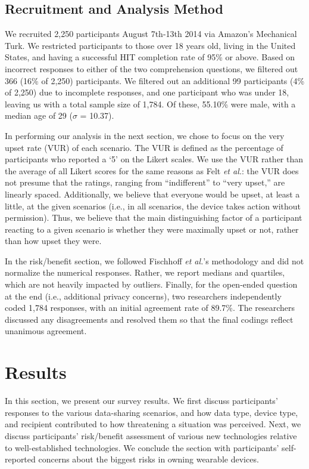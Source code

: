 \documentclass{acm_proc_article-sp}
\begin{document}
\subsection{Recruitment and Analysis Method}
We recruited 2,250 participants August 7th-13th 2014 via Amazon's Mechanical Turk. We restricted participants to those over 18 years old, living in the United States, and having a successful HIT completion rate of 95\% or above. Based on incorrect responses to either of the two comprehension questions, we filtered out 366 (16\% of 2,250) participants. We filtered out an additional 99 participants (4\% of 2,250) due to incomplete responses, and one participant who was under 18, leaving us with a total sample size of 1,784. Of these, 55.10\% were male, with a median age of 29 ($\sigma$ = 10.37).

In performing our analysis in the next section, we chose to focus on the very upset rate (VUR) of each scenario.  The VUR is defined as the percentage of participants who reported a `5' on the Likert scales.
We use the VUR rather than the average of all Likert scores for the same reasons as Felt {\it et al.}: the VUR does not presume that the ratings, ranging from ``indifferent'' to ``very upset,'' are linearly spaced. Additionally, we believe that everyone would be upset, at least a little, at the given scenarios (i.e., in all scenarios, the device takes action without permission). Thus, we believe that the main distinguishing factor of a participant reacting to a given scenario is whether they were maximally upset or not, rather than how upset they were.

In the risk/benefit section, we followed Fischhoff {\it et al.}'s methodology and did not normalize the numerical responses. Rather, we report medians and quartiles, which are not heavily impacted by outliers. Finally, for the open-ended question at the end (i.e., additional privacy concerns), two researchers independently coded 1,784 responses, with an initial agreement rate of 89.7\%. The researchers discussed any disagreements and resolved them so that the final codings reflect unanimous agreement.


\section{Results}
In this section, we present our survey results. We first discuss participants' responses to the various data-sharing scenarios, and how data type, device type, and recipient contributed to how threatening a situation was perceived. Next, we discuss participants' risk/benefit assessment of various new technologies relative to well-established technologies. We conclude the section with participants' self-reported concerns about the biggest risks in owning wearable devices.
\end{document}
